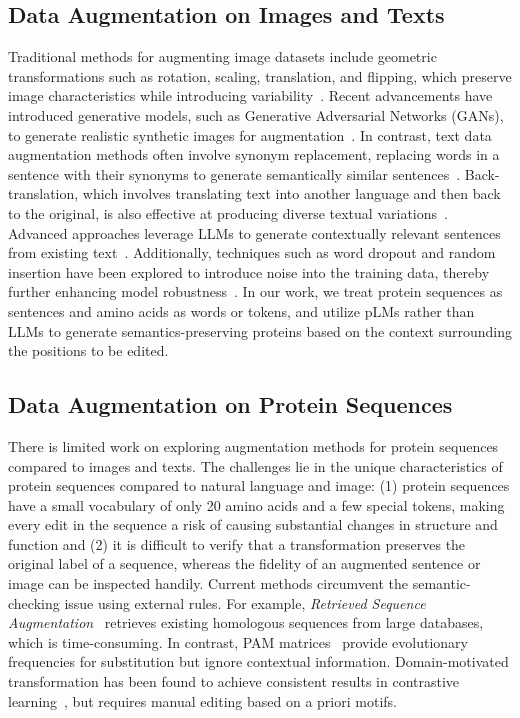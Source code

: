 \documentclass{article}
\begin{document}
\subsection{Data Augmentation on Images and Texts}

Traditional methods for augmenting image datasets include geometric transformations such as rotation, scaling, translation, and flipping, which preserve image characteristics while introducing variability~\cite{krizhevsky2017imagenet}. Recent advancements have introduced generative models, such as Generative Adversarial Networks (GANs), to generate realistic synthetic images for augmentation~\cite{goodfellow2014GAN,gatys2016style}. In contrast, text data augmentation methods often involve synonym replacement, replacing words in a sentence with their synonyms to generate semantically similar sentences~\cite{wei2019eda}. Back-translation, which involves translating text into another language and then back to the original, is also effective at producing diverse textual variations~\cite{sennrich2016edinburghbacktrans}. Advanced approaches leverage LLMs to generate contextually relevant sentences from existing text~\cite{kobayashi2018contextual,dai2025auggpt}. Additionally, techniques such as word dropout and random insertion have been explored to introduce noise into the training data, thereby further enhancing model robustness~\cite{wei2019eda}. In our work, we treat protein sequences as sentences and amino acids as words or tokens, and utilize pLMs rather than LLMs to generate semantics-preserving proteins based on the context surrounding the positions to be edited.

\subsection{Data Augmentation on Protein Sequences}
There is limited work on exploring augmentation methods for protein sequences compared to images and texts. The challenges lie in the unique characteristics of protein sequences compared to natural language and image: (1) protein sequences have a small vocabulary of only 20 amino acids and a few special tokens, making every edit in the sequence a risk of causing substantial changes in structure and function and (2) it is difficult to verify that a transformation preserves the original label of a sequence, whereas the fidelity of an augmented sentence or image can be inspected handily. Current methods circumvent the semantic-checking issue using external rules. For example, \textit{Retrieved Sequence Augmentation}~\cite{ma2023rag} retrieves existing homologous sequences from large databases, which is time-consuming. In contrast, PAM matrices~\cite{oliveira2023temprot} provide evolutionary frequencies for substitution but ignore contextual information. Domain-motivated transformation has been found to achieve consistent results in contrastive learning~\cite{shen2021domainmotivate}, but requires manual editing based on a priori motifs. 
\end{document}
